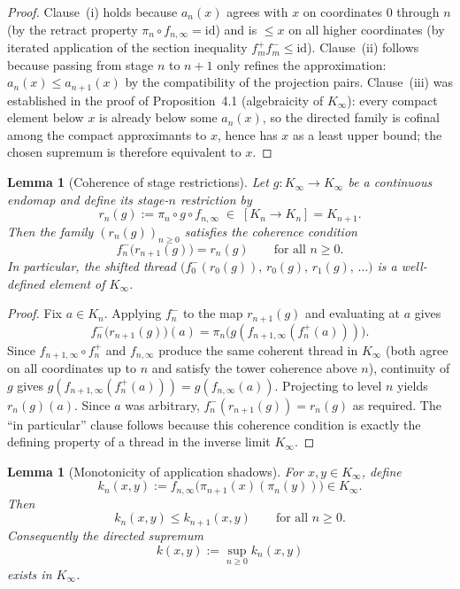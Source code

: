\documentclass[webpdf,traditional,large,numbered]{oup-authoring-template}
\theoremstyle{thmstyleone}%
\newtheorem{lemma}[theorem]{Lemma}
\theoremstyle{thmstyletwo}%
\theoremstyle{thmstylethree}%
\newcommand{\Kinf}{K_\infty}
\begin{document}
\begin{proof}
  Clause~(i) holds because $a_n(x)$ agrees with $x$ on coordinates $0$
  through $n$ (by the retract property $\pi_n\circ f_{n,\infty}=\mathrm{id}$)
  and is $\le x$ on all higher coordinates (by iterated application of the
  section inequality $f_m^+f_m^-\le\mathrm{id}$).  Clause~(ii) follows because
  passing from stage $n$ to $n+1$ only refines the approximation: $a_n(x)\le
  a_{n+1}(x)$ by the compatibility of the projection pairs.  Clause~(iii) was
  established in the proof of Proposition~4.1 (algebraicity of $\Kinf$): every
  compact element below $x$ is already below some $a_n(x)$, so the directed
  family is cofinal among the compact approximants to $x$, hence has $x$ as a
  least upper bound; the chosen supremum is therefore equivalent to $x$.
\end{proof}

\begin{lemma}[Coherence of stage restrictions]\label{lem:coherent-restrict}
  Let $g:\Kinf\to\Kinf$ be a continuous endomap and define its \emph{stage-$n$
  restriction} by
  \[
    r_n(g) := \pi_n\circ g\circ f_{n,\infty} \;\in\; [K_n\to K_n] = K_{n+1}.
  \]
  Then the family $(r_n(g))_{n\ge 0}$ satisfies the coherence condition
  \[
    f_n^-\bigl(r_{n+1}(g)\bigr) = r_n(g)
    \qquad\text{for all } n\ge 0.
  \]
  In particular, the shifted thread $\bigl(f_0^-(r_0(g)),\,r_0(g),\,r_1(g),\,
  \ldots\bigr)$ is a well-defined element of $\Kinf$.
\end{lemma}

\begin{proof}
  Fix $a\in K_n$.  Applying $f_n^-$ to the map $r_{n+1}(g)$ and evaluating at
  $a$ gives
  \[
    f_n^-\bigl(r_{n+1}(g)\bigr)(a)
    = \pi_n\bigl(g(f_{n+1,\infty}(f_n^+(a)))\bigr).
  \]
  Since $f_{n+1,\infty}\circ f_n^+$ and $f_{n,\infty}$ produce the same
  coherent thread in $\Kinf$ (both agree on all coordinates up to $n$ and
  satisfy the tower coherence above $n$), continuity of $g$ gives
  $g(f_{n+1,\infty}(f_n^+(a))) = g(f_{n,\infty}(a))$.  Projecting to level $n$
  yields $r_n(g)(a)$.  Since $a$ was arbitrary, $f_n^-(r_{n+1}(g))=r_n(g)$ as
  required.  The ``in particular'' clause follows because this coherence
  condition is exactly the defining property of a thread in the inverse limit
  $\Kinf$.
\end{proof}

\begin{lemma}[Monotonicity of application shadows]\label{lem:application-shadows}
  For $x,y\in\Kinf$, define
  \[
    k_n(x,y):=f_{n,\infty}\bigl(\pi_{n+1}(x)(\pi_n(y))\bigr)\in\Kinf.
  \]
  Then
  \[
    k_n(x,y)\le k_{n+1}(x,y)
    \qquad\text{for all }n\ge 0.
  \]
  Consequently the directed supremum
  \[
    k(x,y):=\sup_{n\ge 0}k_n(x,y)
  \]
  exists in $\Kinf$.
\end{lemma}
\end{document}
